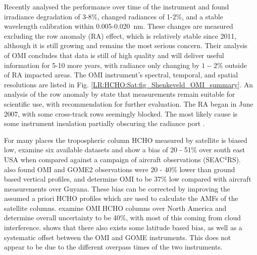     Recently \textcite{Schenkeveld2017} analysed the performance over time of the instrument and found irradiance degradation of 3-8\%, changed radiances of 1-2\%, and a stable wavelength calibration within 0.005-0.020~nm.
    These changes are measured excluding the row anomaly (RA) effect, which is relatively stable since 2011, although it is still growing and remains the most serious concern.
    Their analysis of OMI concludes that data is still of high quality and will deliver useful information for 5-10 more years, with radiance only changing by $1-2\%$ outside of RA impacted areas.
    The OMI instrument's spectral, temporal, and spatial resolutions are listed in Fig. \ref{LR:HCHO:Sat:fig_Shenkeveld_OMI_summary}.
    An analysis of the row anomaly by \textcite{Huang2017} state that measurements remain suitable for scientific use, with recommendation for further evaluation.
    The RA began in June 2007, with some cross-track rows seemingly blocked. 
    The most likely cause is some instrument insulation partially obscuring the radiance port \parencite{Schenkeveld2017}.

    For many places the tropospheric column HCHO measured by satellite is biased low, \textcite{Zhu2016} examine six available datasets and show a bias of 20 - 51\% over south east USA when compared against a campaign of aircraft observations (SEAC$^4$RS).
    \textcite{DeSmedt2015} also found OMI and GOME2 observations were 20 - 40\% lower than ground based vertical profiles, and \textcite{Barkley2013} determine OMI to be 37\% low compared with aircraft measurements over Guyana.
    These bias can be corrected by improving the assumed a priori HCHO profiles which are used to calculate the AMFs of the satellite columns.
    \textcite{Millet2006} examine OMI HCHO columns over North America and determine overall uncertainty to be 40\%, with most of this coming from cloud interference.
    \textcite{Millet2008} shows that there also exists some latitude based bias, as well as a systematic offset between the OMI and GOME instruments.
    This does not appear to be due to the different overpass times of the two instruments.
    
